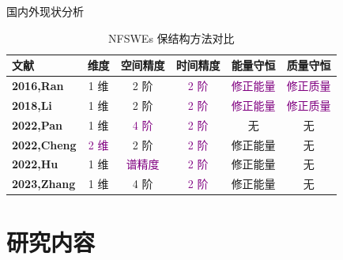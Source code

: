 \documentclass[aspectratio=169]{beamer}
\numberwithin{theorem}{section} %
\numberwithin{equation}{section}%
\numberwithin{figure}{section}%
\numberwithin{table}{section}%
\begin{document}
		\begin{frame}{国内外现状分析}
			\begin{table}[htbp]
				\centering
				\small
				\caption{NFSWEs 保结构方法对比}
					\begin{tabular}{lccccc}
					\toprule
					\textcolor[rgb]{0.227,0.373,0.306}{\textbf{文献}} & \textcolor[rgb]{0.227,0.373,0.306}{\textbf{维度}} & \textcolor[rgb]{0.227,0.373,0.306}{\textbf{空间精度}} & \textcolor[rgb]{0.227,0.373,0.306}{\textbf{时间精度}} & \textcolor[rgb]{0.227,0.373,0.306}{\textbf{能量守恒}} & \textcolor[rgb]{0.227,0.373,0.306}{\textbf{质量守恒}} \\
					\midrule
					\textcolor[rgb]{0.227,0.373,0.306}{\textbf{\cite{ranLinearlyImplicitConservative2016}{2016,Ran}}} & 1 维   & 2 阶   & \textcolor{purple}{2 阶}   & \textcolor{purple}{修正能量}  & \textcolor{purple}{修正质量} \\
					\midrule
					\textcolor[rgb]{0.227,0.373,0.306}{\textbf{\cite{liFastEnergyConserving2018}{2018,Li}}} & 1 维   & 2 阶   & \textcolor{purple}{2 阶}   & \textcolor{purple}{修正能量}  & \textcolor{purple}{修正质量} \\
					\midrule
					\textcolor[rgb]{0.227,0.373,0.306}{\textbf{\cite{panFourthorderDifferenceScheme2022}{2022,Pan}}} & 1 维   & \textcolor{purple}{4 阶}   & \textcolor{purple}{2 阶}   & 无     & 无 \\
					\midrule
					\textcolor[rgb]{0.227,0.373,0.306}{\textbf{\cite{chengConvergenceEnergyconservingScheme2022}{2022,Cheng}}} & \textcolor{purple}{2 维}   & 2 阶   & \textcolor{purple}{2 阶}   & 修正能量  & 无 \\
					\midrule
					\textcolor[rgb]{0.227,0.373,0.306}{\textbf{\cite{huEfficientEnergyPreserving2022}{2022,Hu}}} & 1 维   & \textcolor{purple}{谱精度}   & \textcolor{purple}{2 阶}   & 修正能量  & 无 \\
					\midrule
					\textcolor[rgb]{0.227,0.373,0.306}{\textbf{\cite{zhangHighorderStructurepreservingDifference2023}{2023,Zhang}}} & 1 维   & 4 阶   & \textcolor{purple}{2 阶}   & 修正能量  & 无 \\
					\bottomrule
					\end{tabular}%
				\label{tab:2}%
				\end{table}%
				\end{frame}
	
\section{研究内容}
\end{document}
